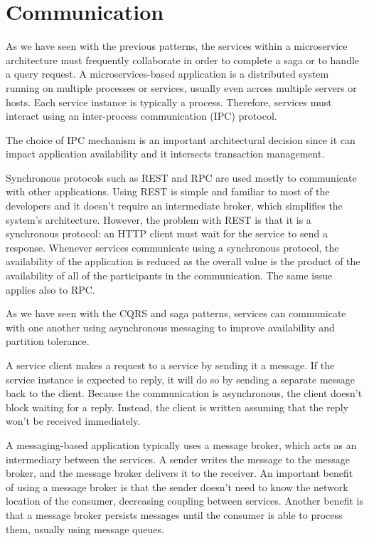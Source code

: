 \documentclass[conference]{IEEEtran}
\begin{document}
\section{Communication}

As we have seen with the previous patterns, the services within a microservice architecture must frequently collaborate in order to complete a saga or to handle a query request. A microservices-based application is a distributed system running on multiple processes or services, usually even across multiple servers or hosts. Each service instance is typically a process. Therefore, services must interact using an inter-process communication (IPC) protocol.

The choice of IPC mechanism is an important architectural decision since it can impact application availability and it intersects transaction management.

Synchronous protocols such as REST \cite{rest} and RPC \cite{rpc} are used mostly to communicate with other applications. Using REST is simple and familiar to most of the developers and it doesn't require an intermediate broker, which simplifies the system's architecture. However, the problem with REST is that it is a synchronous protocol: an HTTP client must wait for the service to send a response. Whenever services communicate using a synchronous protocol, the availability of the application is reduced as the overall value is the product of the availability of all of the participants in the communication. The same issue applies also to RPC.

As we have seen with the CQRS and saga patterns, services can communicate with one another using asynchronous messaging to improve availability and partition tolerance. 

A service client makes a request to a service by sending it a message. If the service instance is expected to reply, it will do so by sending a separate message back to the client. Because the communication is asynchronous, the client doesn't block waiting for a reply. Instead, the client is written assuming that the reply won't be received immediately.

A messaging-based application typically uses a message broker, which acts as an intermediary between the services. A sender writes the message to the message broker, and the message broker delivers it to the receiver. An important benefit of using a message broker is that the sender doesn't need to know the network location of the consumer, decreasing coupling between services. Another benefit is that a message broker persists messages until the consumer is able to process them, usually using message queues. 
\end{document}
